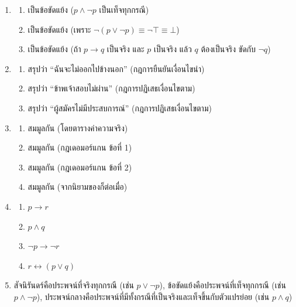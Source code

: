 \begin{enumerate}[label={},leftmargin=1.5em]
    \item
    \begin{enumerate}[label=\textbf{\thechapter.\arabic{enumi}.\arabic*}]
        \item เป็นข้อขัดแย้ง ($p \land \neg p$ เป็นเท็จทุกกรณี)
        \item เป็นข้อขัดแย้ง (เพราะ $\neg(p \lor \neg p) \equiv \neg\top \equiv \bot$)
        \item เป็นข้อขัดแย้ง (ถ้า $p \rightarrow q$ เป็นจริง และ $p$ เป็นจริง แล้ว $q$ ต้องเป็นจริง ขัดกับ $\neg q$)
    \end{enumerate}

    \item
    \begin{enumerate}[label=\textbf{\thechapter.\arabic{enumi}.\arabic*}]
        \item สรุปว่า ``ฉันจะไม่ออกไปข้างนอก'' (กฎการยืนยันเงื่อนไขนำ)
        \item สรุปว่า ``ข้าพเจ้าสอบไม่ผ่าน'' (กฎการปฏิเสธเงื่อนไขตาม)
        \item สรุปว่า ``ผู้สมัครไม่มีประสบการณ์'' (กฎการปฏิเสธเงื่อนไขตาม)
    \end{enumerate}

    \item
    \begin{enumerate}[label=\textbf{\thechapter.\arabic{enumi}.\arabic*}]
        \item สมมูลกัน (โดยตารางค่าความจริง)
        \item สมมูลกัน (กฎเดอมอร์แกน ข้อที่ 1)
        \item สมมูลกัน (กฎเดอมอร์แกน ข้อที่ 2)
        \item สมมูลกัน (จากนิยามของก็ต่อเมื่อ)
    \end{enumerate}

    \item
    \begin{enumerate}[label=\textbf{\thechapter.\arabic{enumi}.\arabic*}]
        \item $p \rightarrow r$
        \item $p \land q$
        \item $\neg p \rightarrow \neg r$
        \item $r \leftrightarrow (p \lor q)$
    \end{enumerate}

    \item สัจนิรันดร์คือประพจน์ที่จริงทุกกรณี (เช่น $p \lor \neg p$), ข้อขัดแย้งคือประพจน์ที่เท็จทุกกรณี (เช่น $p \land \neg p$), ประพจน์กลางคือประพจน์ที่มีทั้งกรณีที่เป็นจริงและเท็จขึ้นกับตัวแปรย่อย (เช่น $p \land q$)


\end{enumerate}
